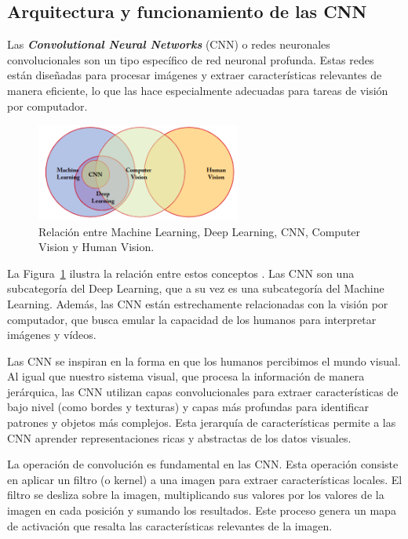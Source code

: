 \documentclass[11pt,spanish,listoffigures,listoftables]{tfgetsinf}
\begin{document}
\subsection{Arquitectura y funcionamiento de las CNN}
Las \textit{\textbf{Convolutional Neural Networks}} (CNN) o redes neuronales convolucionales son un tipo específico de red neuronal profunda. Estas redes están diseñadas para procesar imágenes y extraer características relevantes de manera eficiente, lo que las hace especialmente adecuadas para tareas de visión por computador.

\begin{figure}[H]
   \centering
   \includegraphics[width=0.6\textwidth]{images/estado_del_arte/diagrama_de_Venn_inteligencia_artificial.png}
   \caption{Relación entre Machine Learning, Deep Learning, CNN, Computer Vision y Human Vision.}
   \label{fig:diagrama_de_Venn_inteligencia_artificial}
\end{figure}

La Figura~\ref{fig:diagrama_de_Venn_inteligencia_artificial} ilustra la relación entre estos conceptos \cite{khan2018guide}. Las CNN son una subcategoría del Deep Learning, que a su vez es una subcategoría del Machine Learning. Además, las CNN están estrechamente relacionadas con la visión por computador, que busca emular la capacidad de los humanos para interpretar imágenes y vídeos.

Las CNN se inspiran en la forma en que los humanos percibimos el mundo visual. Al igual que nuestro sistema visual, que procesa la información de manera jerárquica, las CNN utilizan capas convolucionales para extraer características de bajo nivel (como bordes y texturas) y capas más profundas para identificar patrones y objetos más complejos. Esta jerarquía de características permite a las CNN aprender representaciones ricas y abstractas de los datos visuales.

La operación de convolución es fundamental en las CNN. Esta operación consiste en aplicar un filtro (o kernel) a una imagen para extraer características locales. El filtro se desliza sobre la imagen, multiplicando sus valores por los valores de la imagen en cada posición y sumando los resultados. Este proceso genera un mapa de activación que resalta las características relevantes de la imagen. 
\end{document}
